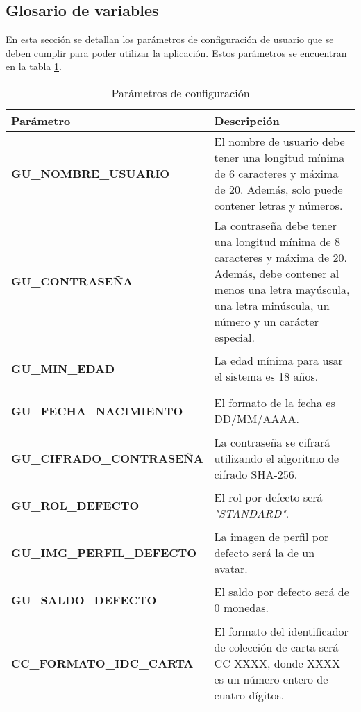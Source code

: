\subsection{Glosario de variables}\hypertarget{anexo:glosario_variables}{}
En esta sección se detallan los parámetros de configuración de usuario que se deben cumplir para poder utilizar la aplicación. Estos parámetros se encuentran en la tabla \ref{table:variables_requisitos}.
\begin{table}[htb]
    \centering
    \caption{Parámetros de configuración}
    \label{table:variables_requisitos}
    \begin{tabular}{>{\columncolor{lightgreen!20}}p{7cm} p{10cm}}
    \toprule
    \rowcolor{darkgreen!50}
    \textbf{Parámetro} & \textbf{Descripción} \\
    \midrule
    \hypertarget{confParam:gu-nombreUsuario}{}
    \textbf{GU\_NOMBRE\_USUARIO} & El nombre de usuario debe tener una longitud mínima de 6 caracteres y máxima de 20. Además, solo puede contener letras y números.  \\
    \midrule
    \hypertarget{confParam:gu-contrasena}{}
    \textbf{GU\_CONTRASEÑA} & La contraseña debe tener una longitud mínima de 8 caracteres y máxima de 20. Además, debe contener al menos una letra mayúscula, una letra minúscula, un número y un carácter especial. \\
    \midrule
    \hypertarget{confParam:gu-minEdad}{}
    \textbf{GU\_MIN\_EDAD} & La edad mínima para usar el sistema es 18 años. \\
    \midrule
    \hypertarget{confParam:gu-fechaNacimiento}{}
    \textbf{GU\_FECHA\_NACIMIENTO} & El formato  de la fecha es DD/MM/AAAA. \\
    \midrule
    \hypertarget{confParam:gu-cifradoContrasena}{}
    \textbf{GU\_CIFRADO\_CONTRASEÑA} & La contraseña se cifrará utilizando el algoritmo de cifrado SHA-256.  \\
    \midrule
    \hypertarget{confParam:gu-rolDefecto}{}
    \textbf{GU\_ROL\_DEFECTO} & El rol por defecto será \textit{"STANDARD"}. \\
    \midrule
    \hypertarget{confParam:gu-imgPerfilDefecto}{}
    \textbf{GU\_IMG\_PERFIL\_DEFECTO} & La imagen de perfil por defecto será la de un avatar.  \\
    \midrule
    \hypertarget{confParam:gu-saldoDefecto}{}
    \textbf{GU\_SALDO\_DEFECTO} & El saldo por defecto será de 0 monedas. \\
    \midrule
    \hypertarget{confParam:cc-formatoIDCCarta}{}
    \textbf{CC\_FORMATO\_IDC\_CARTA} & El formato del identificador de colección de carta será CC-XXXX, donde XXXX es un número entero de cuatro dígitos. \\
    \bottomrule
    \end{tabular}
\end{table}